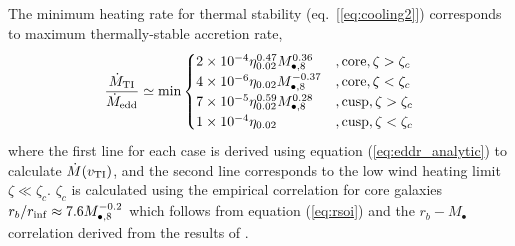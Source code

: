 \documentclass[usenatbib,fleqn]{mn2e}
\begin{document}
The minimum heating rate for thermal stability (eq.~[\ref{eq:cooling2}]) corresponds to maximum thermally-stable accretion rate,
\begin{align}
  \frac{\dot{M}_{\rm TI}}{\dot{M}_{\rm edd}} \simeq {\rm
    min}\begin{cases}
    2\times 10^{-4} \eta_{0.02}^{0.47} M_{\bullet,8}^{0.36} &, \text{core}, \zeta > \zeta_c\\
    4\times 10^{-6}\eta_{0.02}M_{\bullet,8}^{-0.37} &, \text{core}, \zeta < \zeta_c \\
    7\times 10^{-5} \eta_{0.02}^{0.59} M_{\bullet,8}^{0.28}    &, \text{cusp}, \zeta > \zeta_c\\
    1\times 10^{-4}\eta_{0.02}&, \text{cusp}, \zeta < \zeta_c
  \end{cases}
  \label{eq:Mdotmax}
\end{align}
where the first line for each case is derived using equation
(\ref{eq:eddr_analytic}) to calculate $\dot{M}(v_{\rm TI})$, and
the second line corresponds to the low wind heating limit $\zeta \ll
\zeta_c$.  $\zeta_c$ is calculated using the empirical correlation for
core galaxies $r_{b}/r_{\rm inf} \approx 7.6M_{\bullet,8}^{-0.2}$ which
follows from equation (\ref{eq:rsoi}) and the $r_b-M_{\bullet}$
correlation derived from the results of \citet{LauerFaber+:2007a}.
\end{document}
